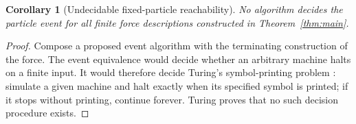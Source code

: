 \documentclass[11pt]{article}
\newtheorem{corollary}[theorem]{Corollary}
\theoremstyle{remark}\newtheorem{remark}[theorem]{Remark}
\begin{document}
\begin{corollary}[Undecidable fixed-particle reachability]
No algorithm decides the particle event for all finite force
descriptions constructed in Theorem~\ref{thm:main}.
\end{corollary}
\begin{proof}
Compose a proposed event algorithm with the terminating construction of
the force. The event equivalence would decide whether an arbitrary machine
halts on a finite input. It would therefore decide Turing's symbol-printing
problem \cite[Section~8]{Turing1936}: simulate a given machine and halt
exactly when its specified symbol is printed; if it stops without printing,
continue forever. Turing proves that no such decision procedure exists.
\end{proof}



\end{document}
